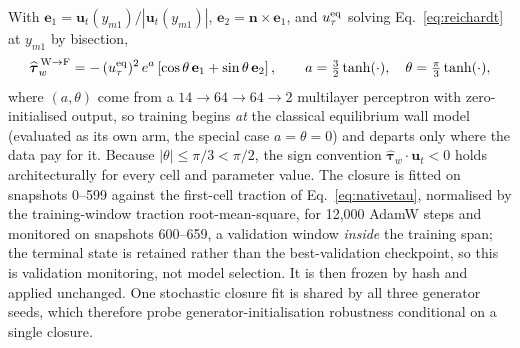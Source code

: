 With $\mathbf e_1=\mathbf u_t(y_{m1})/|\mathbf u_t(y_{m1})|$,
$\mathbf e_2=\mathbf n\times\mathbf e_1$, and $u_\tau^{\rm eq}$ solving Eq.~\eqref{eq:reichardt}
at $y_{m1}$ by bisection,
\begin{equation}
\widehat{\boldsymbol\tau}_w^{\,\mathrm{W\to F}}
=-\,(u_\tau^{\rm eq})^2\,e^{a}\left[\cos\theta\,\mathbf e_1+\sin\theta\,\mathbf e_2\right],
\qquad a=\tfrac32\tanh(\cdot),\quad \theta=\tfrac{\pi}{3}\tanh(\cdot),
\label{eq:closuretau}
\end{equation}
where $(a,\theta)$ come from a $14\to64\to64\to2$ multilayer perceptron with zero-initialised
output, so training begins \emph{at} the classical equilibrium wall model (evaluated as its own arm,
the special case $a=\theta=0$) and departs only where the data pay for it.
Because $|\theta|\leq\pi/3<\pi/2$, the sign convention
$\widehat{\boldsymbol\tau}_w\!\cdot\mathbf u_t<0$ holds architecturally for every cell and
parameter value. The closure is fitted on snapshots 0--599 against the first-cell traction of
Eq.~\eqref{eq:nativetau}, normalised by the training-window traction root-mean-square, for 12,000
AdamW steps and monitored on snapshots 600--659, a validation window \emph{inside} the training
span; the terminal state is retained rather than the best-validation checkpoint, so this is
validation monitoring, not model selection. It is then frozen by hash and applied unchanged. One
stochastic closure fit is shared by all three generator seeds, which therefore probe
generator-initialisation robustness conditional on a single closure.


